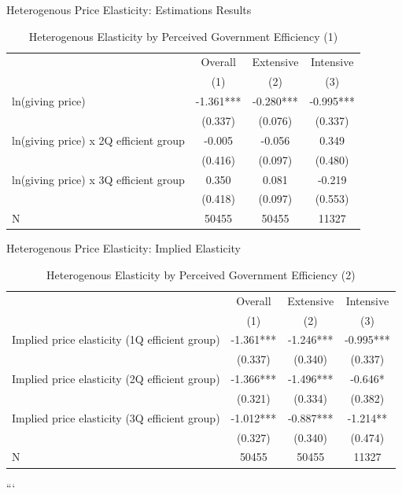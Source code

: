 \documentclass[
  ignorenonframetext,
]{beamer}
\begin{document}
\begin{frame}{Heterogenous Price Elasticity: Estimations Results}
\protect\hypertarget{heterogenous-price-elasticity-estimations-results}{}
\begin{table}

\caption{\label{tab:kableHeteroElasticitySlide1}Heterogenous Elasticity by Perceived Government Efficiency (1)}
\centering
\fontsize{8}{10}\selectfont
\begin{tabular}[t]{lccc}
\toprule
\multicolumn{1}{c}{ } & \multicolumn{1}{c}{Overall} & \multicolumn{1}{c}{Extensive} & \multicolumn{1}{c}{Intensive} \\
\cmidrule(l{3pt}r{3pt}){2-2} \cmidrule(l{3pt}r{3pt}){3-3} \cmidrule(l{3pt}r{3pt}){4-4}
 & (1) & (2) & (3)\\
\midrule
ln(giving price) & -1.361*** & -0.280*** & -0.995***\\
 & (0.337) & (0.076) & (0.337)\\
ln(giving price) x 2Q efficient group & -0.005 & -0.056 & 0.349\\
 & (0.416) & (0.097) & (0.480)\\
ln(giving price) x 3Q efficient group & 0.350 & 0.081 & -0.219\\
 & (0.418) & (0.097) & (0.553)\\
N & 50455 & 50455 & 11327\\
\bottomrule
\end{tabular}
\end{table}
\end{frame}

\begin{frame}{Heterogenous Price Elasticity: Implied Elasticity}
\protect\hypertarget{heterogenous-price-elasticity-implied-elasticity}{}
\begin{table}

\caption{\label{tab:kableHeteroElasticitySlide2}Heterogenous Elasticity by Perceived Government Efficiency (2)}
\centering
\fontsize{8}{10}\selectfont
\begin{tabular}[t]{lccc}
\toprule
\multicolumn{1}{c}{ } & \multicolumn{1}{c}{Overall} & \multicolumn{1}{c}{Extensive} & \multicolumn{1}{c}{Intensive} \\
\cmidrule(l{3pt}r{3pt}){2-2} \cmidrule(l{3pt}r{3pt}){3-3} \cmidrule(l{3pt}r{3pt}){4-4}
 & (1) & (2) & (3)\\
\midrule
Implied price elasticity (1Q efficient group) & -1.361*** & -1.246*** & -0.995***\\
 & (0.337) & (0.340) & (0.337)\\
Implied price elasticity (2Q efficient group) & -1.366*** & -1.496*** & -0.646*\\
 & (0.321) & (0.334) & (0.382)\\
Implied price elasticity (3Q efficient group) & -1.012*** & -0.887*** & -1.214**\\
 & (0.327) & (0.340) & (0.474)\\
N & 50455 & 50455 & 11327\\
\bottomrule
\end{tabular}
\end{table}

```
\end{frame}
\end{document}
